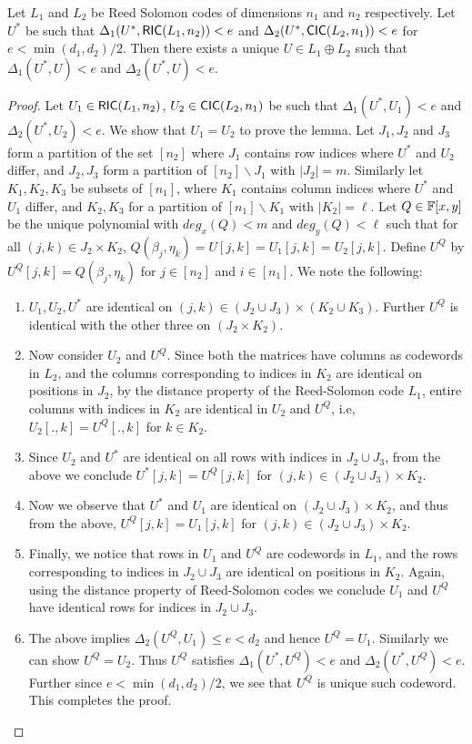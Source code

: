 \begin{lemma}\label{lem:bicdecoding}
Let $L_1$ and $L_2$ be Reed Solomon codes of dimensions $n_1$ and $n_2$
respectively. Let $U^\ast$ be such that $\Delta_1(U^\ast,\mathsf{RIC}(L_1,n_2))<e$
and $\Delta_2(U^\ast,\mathsf{CIC}(L_2,n_1))<e$ for $e < \min(d_1,d_2)/2$. Then there exists a
unique
$U\in L_1\oplus L_2$ such that $\Delta_1(U^\ast,U)<e$ and
$\Delta_2(U^\ast,U)<e$.
\end{lemma}
\begin{proof}
Let $U_1\in \mathsf{RIC}(L_1,n_2)$, $U_2\in \mathsf{CIC}(L_2,n_1)$ be such that
$\Delta_1(U^\ast,U_1)<e$ and $\Delta_2(U^\ast,U_2)<e$. We show that $U_1=U_2$
to prove the lemma. Let $J_1,J_2$ and $J_3$ form a partition of the set $[n_2]$
where $J_1$ contains row indices where $U^\ast$ and $U_2$ differ, and $J_2,J_3$
form a partition of $[n_2]\backslash J_1$ with $|J_2|=m$. Similarly let
$K_1,K_2,K_3$ be subsets of $[n_1]$, where $K_1$ contains column indices where
$U^\ast$ and $U_1$ differ, and $K_2,K_3$ for a partition of $[n_1]\backslash
K_1$ with $|K_2|=\ell$. Let $Q\in \mathbb{F}[x,y]$ be the unique polynomial with
$deg_x(Q)<m$ and $deg_y(Q)<\ell$ such that for all $(j,k)\in J_2\times K_2$,
$Q(\beta_j,\eta_k)=U[j,k]=U_1[j,k]=U_2[j,k]$. Define $U^Q$ by
$U^Q[j,k]=Q(\beta_j,\eta_k)$ for $j\in [n_2]$ and $i\in [n_1]$. We note the
following:
\begin{enumerate}[{\rm 1.}]
\item $U_1,U_2,U^\ast$ are identical on $(j,k)\in (J_2\cup J_3)\times (K_2\cup
K_3)$. Further $U^Q$ is identical with the other three on $(J_2\times K_2)$.
\item Now consider $U_2$ and $U^Q$. Since both the matrices have columns as
codewords in $L_2$, and the columns corresponding to indices in $K_2$ are
identical on positions in $J_2$, by the distance property of the Reed-Solomon
code $L_1$, entire columns with indices in $K_2$ are identical in $U_2$ and
$U^Q$, i.e, $U_2[.,k]=U^Q[.,k]$ for $k\in K_2$.
\item Since $U_2$ and $U^\ast$ are identical on all rows with indices in
$J_2\cup J_3$, from the above we conclude $U^\ast[j,k]=U^Q[j,k]$ for $(j,k)\in
(J_2\cup J_3)\times K_2$.
\item Now we observe that $U^\ast$ and $U_1$ are identical on $(J_2\cup
J_3)\times K_2$, and thus from the above, $U^Q[j,k]=U_1[j,k]$ for $(j,k)\in
(J_2\cup J_3)\times K_2$.
\item Finally, we notice that rows in $U_1$ and $U^Q$ are codewords in $L_1$,
and the rows corresponding to indices in $J_2\cup J_3$ are identical on
positions in $K_2$. Again, using the distance property of Reed-Solomon codes we
conclude $U_1$ and $U^Q$ have identical rows for indices in $J_2\cup J_3$. 
\item The above implies $\Delta_2(U^Q,U_1)\leq e < d_2$ and hence $U^Q=U_1$.
Similarly we can show $U^Q=U_2$. Thus $U^Q$ satisfies $\Delta_1(U^\ast,U^Q)<e$
and $\Delta_2(U^\ast,U^Q)<e$. Further since $e < \min(d_1,d_2)/2$, we see that
$U^Q$ is unique such codeword. This completes the proof.
\end{enumerate}
\end{proof}
   
